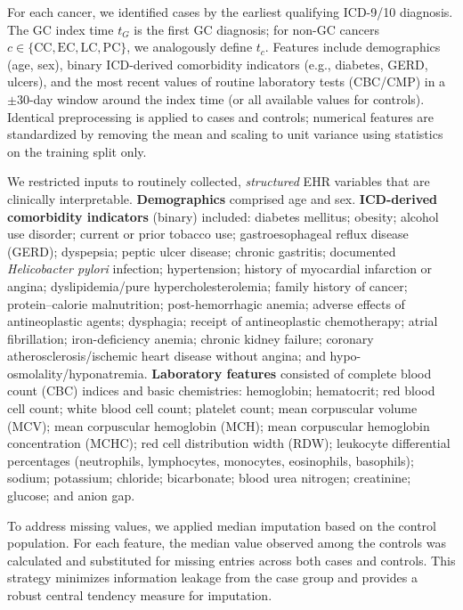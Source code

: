 \documentclass[diagnostics,article,submit,pdftex,moreauthors]{Definitions/mdpi}
\begin{document}
For each cancer, we identified cases by the earliest qualifying ICD-9/10 diagnosis.
The GC index time $t_G$ is the first GC diagnosis; for non-GC cancers $c\in\{\mathrm{CC},\mathrm{EC},\mathrm{LC},\mathrm{PC}\}$, we analogously define $t_c$.
Features include demographics (age, sex), binary ICD-derived comorbidity indicators (e.g., diabetes, GERD, ulcers), and the most recent values of routine laboratory tests (CBC/CMP) in a $\pm 30$-day window around the index time (or all available values for controls).
Identical preprocessing is applied to cases and controls; numerical features are standardized by removing the mean and scaling to unit variance using statistics on the training split only.

We restricted inputs to routinely collected, \textit{structured} EHR variables that are clinically interpretable. 
\textbf{Demographics} comprised age and sex. 
\textbf{ICD-derived comorbidity indicators} (binary) included: diabetes mellitus; obesity; alcohol use disorder; current or prior tobacco use; gastroesophageal reflux disease (GERD); dyspepsia; peptic ulcer disease; chronic gastritis; documented \textit{Helicobacter pylori} infection; hypertension; history of myocardial infarction or angina; dyslipidemia/pure hypercholesterolemia; family history of cancer; protein–calorie malnutrition; post-hemorrhagic anemia; adverse effects of antineoplastic agents; dysphagia; receipt of antineoplastic chemotherapy; atrial fibrillation; iron-deficiency anemia; chronic kidney failure; coronary atherosclerosis/ischemic heart disease without angina; and hypo-osmolality/hyponatremia. 
\textbf{Laboratory features} consisted of complete blood count (CBC) indices and basic chemistries: hemoglobin; hematocrit; red blood cell count; white blood cell count; platelet count; mean corpuscular volume (MCV); mean corpuscular hemoglobin (MCH); mean corpuscular hemoglobin concentration (MCHC); red cell distribution width (RDW); leukocyte differential percentages (neutrophils, lymphocytes, monocytes, eosinophils, basophils); sodium; potassium; chloride; bicarbonate; blood urea nitrogen; creatinine; glucose; and anion gap. 

To address missing values, we applied median imputation based on the control population. 
For each feature, the median value observed among the controls was calculated and substituted for missing entries across both cases and controls. 
This strategy minimizes information leakage from the case group and provides a robust central tendency measure for imputation.
\end{document}
